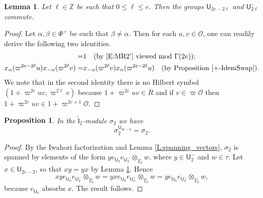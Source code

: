 \documentclass[10pt, letterpaper]{amsart}
\theoremstyle{plain}
\newtheorem{Prop}[equation]{Proposition}
\newtheorem{Lem}[equation]{Lemma}
\theoremstyle{definition}
\numberwithin{equation}{section}
\newcommand{\Tt}{\widetilde{T}}
\newcommand{\Ocal}{\mathcal{O}}
\newcommand{\If}{\mathsf{I}}
\newcommand{\Uf}{\mathsf{U}}
\begin{document}
\begin{Lem}\label{pmUniComm}
	Let $\ell\in \mathbb{Z}$ be such that $0\leq \ell\leq e$. Then the groups ${\Uf}_{2e-2\ell}$ and ${\Uf}^{-}_{2\ell}$ commute.
\end{Lem}
\begin{proof}
Let $\alpha,\beta\in\Phi^{+}$ be such that $\beta\neq \alpha$. Then for each $u,v\in\mathcal{O}$, one can readily derive the following two identities.
	\begin{align*}
		[x_{\alpha}(\varpi^{2e-2\ell}u),x_{-\beta}(\varpi^{2\ell}v)]=&1 \quad (\text{by \eqref{E:MR2'} viewed mod $\Gamma(2e)$});\\
		x_{\alpha}(\varpi^{2e-2\ell}u)x_{-\alpha}(\varpi^{2\ell}v)=&x_{-\alpha}(\varpi^{2\ell}v)x_{\alpha}(\varpi^{2e-2\ell}u)\quad (\text{by Proposition \ref{+-IdemSwap}}).
	\end{align*}
	We note that in the second identity there is no Hilbert symbol $(1+\varpi^{2e}uv,\varpi^{2\ell}v)$ because $1+\varpi^{2e}uv\in R$ and if $v\in \varpi\Ocal$ then $1+\varpi^{2e}uv\in 1+\varpi^{2e+1}\Ocal$. 
\end{proof}



\begin{Prop}\label{Sig2UInvar} In the $\widetilde{{\If}}_{2}$-module $\sigma_{2}$ we have
	\begin{equation*}
		\sigma_{2}^{{\Uf}_{2e-2}}=\sigma_{2}.
	\end{equation*}
\end{Prop}

\begin{proof}
	By the Iwahori factorization and Lemma \ref{L:spanning_vectors}, $\sigma_{2}$ is spanned by elements of the form $ye_{{\Uf}_{0}}e_{{\Uf}^{-}_{2}}\otimes_{\Tt_{0}} w$, where $y\in {\Uf}^{-}_{2}$ and $w\in \tau$. Let $x\in \Uf_{2e-2}$, so that $xy=yx$ by Lemma \ref{pmUniComm}. Hence 
    \[
    xye_{{\Uf}_{0}}e_{{\Uf}^{-}_{2}}\otimes_{\Tt_{0}} w=yxe_{{\Uf}_{0}}e_{{\Uf}^{-}_{2}}\otimes_{\Tt_{0}} w=ye_{{\Uf}_{0}}e_{{\Uf}^{-}_{2}}\otimes_{\Tt_{0}} w,
    \]
    because $e_{\Uf_0}$ absorbs $x$. The result follows.
\end{proof}

\end{document}
